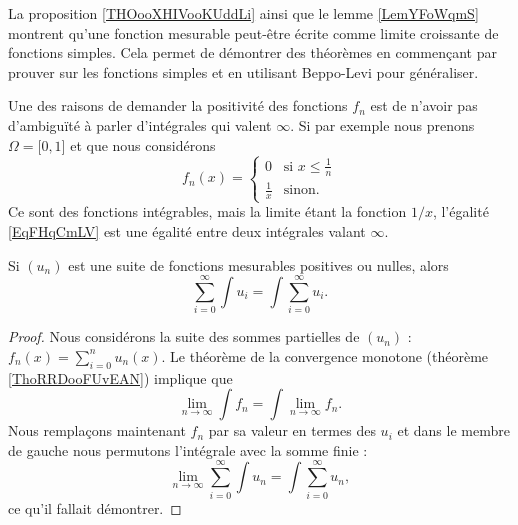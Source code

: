 \begin{remark}
    La proposition \ref{THOooXHIVooKUddLi} ainsi que le lemme \ref{LemYFoWqmS} montrent qu'une fonction mesurable peut-être écrite comme limite croissante de fonctions simples. Cela permet de démontrer des théorèmes en commençant par prouver sur les fonctions simples et en utilisant Beppo-Levi pour généraliser.
\end{remark}

\begin{remark}
    Une des raisons de demander la positivité des fonctions \( f_n\) est de n'avoir pas d'ambiguïté à parler d'intégrales qui valent \( \infty\). Si par exemple nous prenons \( \Omega=\mathopen[ 0 , 1 \mathclose]\) et que nous considérons
    \begin{equation}
        f_n(x)=\begin{cases}
            0    &   \text{si } x\leq \frac{1}{ n }\\
            \frac{1}{ x }    &    \text{sinon}.
        \end{cases}
    \end{equation}
    Ce sont des fonctions intégrables, mais la limite étant la fonction \( 1/x\), l'égalité \eqref{EqFHqCmLV} est une égalité entre deux intégrales valant \( \infty\).
\end{remark}

\begin{corollary} \label{CorNKXwhdz}
    Si \( (u_n)\) est une suite de fonctions mesurables positives ou nulles, alors
    \begin{equation}
        \sum_{i=0}^{\infty}\int u_i=\int\sum_{i=0}^{\infty}u_i.
    \end{equation}
\end{corollary}

\begin{proof}
    Nous considérons la suite des sommes partielles de \( (u_n)\) : \( f_n(x)=\sum_{i=0}^nu_n(x)\). Le théorème de la convergence monotone (théorème \ref{ThoRRDooFUvEAN}) implique que
    \begin{equation}
        \lim_{n\to \infty} \int f_n=\int\lim_{n\to \infty} f_n.
    \end{equation}
    Nous remplaçons maintenant \( f_n\) par sa valeur en termes des \( u_i\) et dans le membre de gauche nous permutons l'intégrale avec la somme finie :
    \begin{equation}
        \lim_{n\to \infty} \sum_{i=0}^{\infty}\int u_n=\int\sum_{i=0}^{\infty}u_n,
    \end{equation}
    ce qu'il fallait démontrer.
\end{proof}

